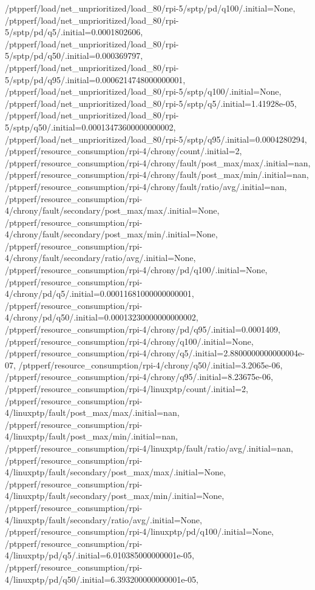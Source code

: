 {    /ptpperf/load/net_unprioritized/load_80/rpi-5/sptp/pd/q100/.initial=None,
    /ptpperf/load/net_unprioritized/load_80/rpi-5/sptp/pd/q5/.initial=0.0001802606,
    /ptpperf/load/net_unprioritized/load_80/rpi-5/sptp/pd/q50/.initial=0.000369797,
    /ptpperf/load/net_unprioritized/load_80/rpi-5/sptp/pd/q95/.initial=0.0006214748000000001,
    /ptpperf/load/net_unprioritized/load_80/rpi-5/sptp/q100/.initial=None,
    /ptpperf/load/net_unprioritized/load_80/rpi-5/sptp/q5/.initial=1.41928e-05,
    /ptpperf/load/net_unprioritized/load_80/rpi-5/sptp/q50/.initial=0.00013473600000000002,
    /ptpperf/load/net_unprioritized/load_80/rpi-5/sptp/q95/.initial=0.0004280294,
    /ptpperf/resource_consumption/rpi-4/chrony/count/.initial=2,
    /ptpperf/resource_consumption/rpi-4/chrony/fault/post_max/max/.initial=nan,
    /ptpperf/resource_consumption/rpi-4/chrony/fault/post_max/min/.initial=nan,
    /ptpperf/resource_consumption/rpi-4/chrony/fault/ratio/avg/.initial=nan,
    /ptpperf/resource_consumption/rpi-4/chrony/fault/secondary/post_max/max/.initial=None,
    /ptpperf/resource_consumption/rpi-4/chrony/fault/secondary/post_max/min/.initial=None,
    /ptpperf/resource_consumption/rpi-4/chrony/fault/secondary/ratio/avg/.initial=None,
    /ptpperf/resource_consumption/rpi-4/chrony/pd/q100/.initial=None,
    /ptpperf/resource_consumption/rpi-4/chrony/pd/q5/.initial=0.00011681000000000001,
    /ptpperf/resource_consumption/rpi-4/chrony/pd/q50/.initial=0.00013230000000000002,
    /ptpperf/resource_consumption/rpi-4/chrony/pd/q95/.initial=0.0001409,
    /ptpperf/resource_consumption/rpi-4/chrony/q100/.initial=None,
    /ptpperf/resource_consumption/rpi-4/chrony/q5/.initial=2.8800000000000004e-07,
    /ptpperf/resource_consumption/rpi-4/chrony/q50/.initial=3.2065e-06,
    /ptpperf/resource_consumption/rpi-4/chrony/q95/.initial=8.23675e-06,
    /ptpperf/resource_consumption/rpi-4/linuxptp/count/.initial=2,
    /ptpperf/resource_consumption/rpi-4/linuxptp/fault/post_max/max/.initial=nan,
    /ptpperf/resource_consumption/rpi-4/linuxptp/fault/post_max/min/.initial=nan,
    /ptpperf/resource_consumption/rpi-4/linuxptp/fault/ratio/avg/.initial=nan,
    /ptpperf/resource_consumption/rpi-4/linuxptp/fault/secondary/post_max/max/.initial=None,
    /ptpperf/resource_consumption/rpi-4/linuxptp/fault/secondary/post_max/min/.initial=None,
    /ptpperf/resource_consumption/rpi-4/linuxptp/fault/secondary/ratio/avg/.initial=None,
    /ptpperf/resource_consumption/rpi-4/linuxptp/pd/q100/.initial=None,
    /ptpperf/resource_consumption/rpi-4/linuxptp/pd/q5/.initial=6.010385000000001e-05,
    /ptpperf/resource_consumption/rpi-4/linuxptp/pd/q50/.initial=6.393200000000001e-05,
}
